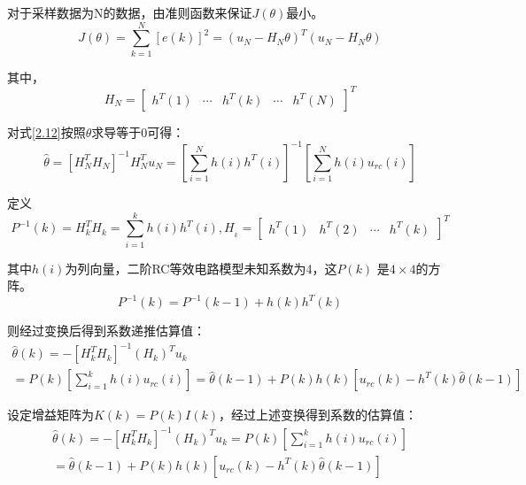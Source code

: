 对于采样数据为N的数据，由准则函数来保证$J\left( \theta  \right)$最小。
\begin{equation}\label{2.12}
J\left( \theta  \right) = \sum\limits_{k = 1}^N {\left[ {e(k)} \right]_{}^2}  = {\left( {{u_N} - {H_N}\theta } \right)^T}({u_N} - {H_N}\theta )
\end{equation}

其中，
\begin{equation}
{H_N} = {\left[ {\begin{array}{*{20}{c}}
{{h^T}(1)}& \cdots &{{h^T}(k)}& \cdots &{{h^T}(N)}
\end{array}} \right]^T}
\end{equation}

对式\ref{2.12}按照$\theta$求导等于0可得：
\begin{equation}
\widehat \theta  = {\left[ {H_N^T{H_N}} \right]^{ - 1}}H_N^T{u_N} = {\left[ {\sum\limits_{i = 1}^N {h(i){h^T}(i)} } \right]^{ - 1}}\left[ {\sum\limits_{i = 1}^N {h(i){u_{rc}}(i)} } \right]
\end{equation}

定义
\begin{equation}
{P^{ - 1}}(k) = H_k^T{H_k} = {\sum\limits_{i = 1}^k {h(i){h^T}(i),{H_{_k}} = \left[ {\begin{array}{*{20}{c}}
{{h^T}(1)}&{{h^T}(2)}& \cdots &{{h^T}(k)}
\end{array}} \right]} ^T}
\end{equation}

其中$h\left( i \right)$为列向量，二阶RC等效电路模型未知系数为4，这$P\left( k \right)$ 是$4 \times 4$的方阵。
\begin{equation}
{P^{ - 1}}(k) = {P^{ - 1}}(k - 1) + h(k){h^T}(k)
\end{equation}

则经过变换后得到系数递推估算值：
\begin{equation}
\begin{array}{l}
\widehat \theta (k) =  - {\left[ {H_k^T{H_k}} \right]^{ - 1}}{({H_k})^T}{u_k}\\
 = P(k)\left[ {\sum\limits_{i = 1}^k {h(i){u_{rc}}(i)} } \right] = \widehat \theta (k - 1) + P(k)h(k)\left[ {{u_{rc}}(k) - {h^T}(k)\widehat \theta (k - 1)} \right]
\end{array}
\end{equation}

设定增益矩阵为$K\left( k \right) = P\left( k \right)I\left( k \right)$，经过上述变换得到系数的估算值：
\begin{equation}
\begin{array}{l}
\widehat \theta (k) =  - {\left[ {H_k^T{H_k}} \right]^{ - 1}}{({H_k})^T}{u_k} = P(k)\left[ {\sum\limits_{i = 1}^k {h(i){u_{rc}}(i)} } \right]\\
 = \widehat \theta (k - 1) + P(k)h(k)\left[ {{u_{rc}}(k) - {h^T}(k)\widehat \theta (k - 1)} \right]
\end{array}
\end{equation}

